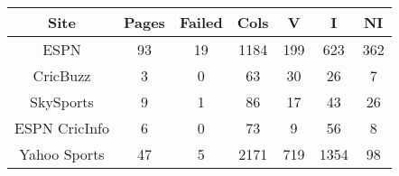 \begin{table*}[hbtp]
\centering
\begin{tabular}{ |c|c|c|c|c|c|c| }
 \hline
 Site & Pages & Failed & Cols & V & I & NI \\
 \hline
 ESPN & 93 & 19 & 1184 & 199 & 623 & 362 \\
 \hline
 CricBuzz & 3 & 0 & 63 & 30 & 26 & 7\\
 \hline
 SkySports & 9 & 1 & 86 & 17 & 43 & 26 \\
 \hline
 ESPN CricInfo & 6 & 0 & 73 & 9 & 56 & 8 \\
 \hline
 Yahoo Sports & 47 & 5 & 2171 & 719 & 1354 & 98 \\


\end{tabular}
\end{table*}
